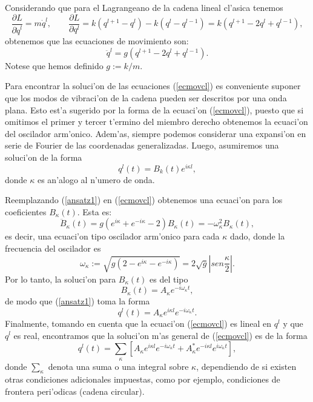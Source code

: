 Considerando que para el Lagrangeano de la cadena lineal cl'asica tenemos
\begin{equation}
\frac{\partial L}{\partial\dot{q}^{l}}=m\dot{q}^l, \qquad \frac{\partial
L}{\partial q^{l}}=k(q^{l+1}-q^l)-k(q^l-q^{l-1})=k(q^{l+1}-2q^l+q^{l-1}),
\end{equation}
obtenemos que las ecuaciones de movimiento son:
\begin{equation}
\ddot{q}^l=g(q^{l+1}-2q^l+q^{l-1}).
\label{ecmovcl}
\end{equation}
Notese que hemos definido $g:=k/m$.

Para encontrar la soluci'on de las ecuaciones (\ref{ecmovcl}) es conveniente
suponer que los modos de vibraci'on de la cadena pueden ser descritos por una
onda plana. Esto est'a sugerido por la forma de la ecuaci'on (\ref{ecmovcl}),
puesto que si omitimos el primer y tercer t'ermino del miembro derecho obtenemos
la ecuaci'on del oscilador arm'onico. Adem'as, siempre podemos considerar una
expansi'on en serie de Fourier de las coordenadas generalizadas. Luego,
asumiremos una soluci'on de la forma
\begin{equation}
q^l(t)=B_k(t) e^{i\kappa l},
\label{ansatz1}
\end{equation}
donde $\kappa$ es an'alogo al n'umero de onda.

Reemplazando (\ref{ansatz1}) en (\ref{ecmovcl}) obtenemos una ecuaci'on para los
coeficientes $B_\kappa(t)$. Esta es:
\begin{equation}
\ddot{B}_\kappa(t)=g\left(e^{i\kappa}+e^{-i\kappa}
-2\right)B_\kappa(t)=-\omega_\kappa^2B_\kappa(t),
\end{equation}
es decir, una ecuaci'on tipo oscilador arm'onico para cada $\kappa$ dado, donde
la frecuencia del oscilador es
\begin{equation}
\omega_\kappa:=\sqrt{g\left(2-e^{i\kappa}-e^{-i\kappa}\right)}=2\sqrt{g}
\left|sen\frac{\kappa}{2}\right|.
\end{equation}
Por lo tanto, la soluci'on para $B_\kappa(t)$ es del tipo
\begin{equation}
B_\kappa(t)=A_\kappa e^{-i\omega_\kappa t},
\end{equation}
de modo que (\ref{ansatz1}) toma la forma
\begin{equation}
q^l(t)=A_\kappa e^{i\kappa l}e^{-i\omega_\kappa t}.
\end{equation}
Finalmente, tomando en cuenta que la ecuaci'on (\ref{ecmovcl}) es lineal en
$q^l$ y que $q^l$ es real, encontramos que la soluci'on m'as general de 
(\ref{ecmovcl}) es de la forma
\begin{equation}
q^l(t)=\sum_\kappa\left[A_\kappa e^{i\kappa l}e^{-i\omega_\kappa t}+A^*_\kappa
e^{-i\kappa l}e^{i\omega_\kappa t}\right],
\end{equation}
donde $\sum_\kappa$ denota una suma o una integral sobre $\kappa$, dependiendo
de si existen otras condiciones adicionales impuestas, como por ejemplo,
condiciones de frontera peri'odicas (cadena circular).


